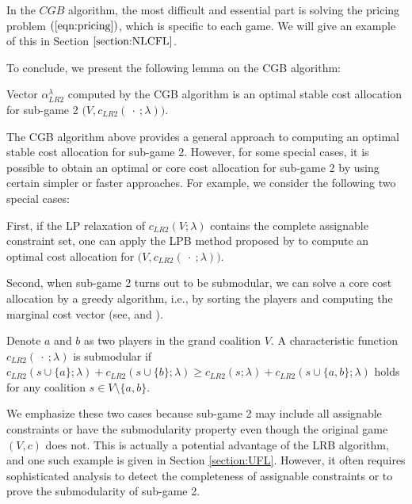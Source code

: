 \documentclass[ijoc,nonblindrev]{informs3} %
\begin{document}
In the $CGB$ algorithm, the most difficult and essential part is solving the pricing problem $(\ref{eqn:pricing})$, which is specific to each game. We will give an example of this in Section $\ref{section:NLCFL}$.

To conclude, we present the following lemma on the CGB algorithm:
\begin {lemma}\label{lemma:lr2core}
Vector $\alpha_{LR2}^{\lambda}$ computed by the CGB algorithm is an optimal stable cost allocation for sub-game 2 $\big(V,c_{LR2}(\ \cdot\ ;\lambda)\big)$.
\end {lemma}

The CGB algorithm above provides a general approach to computing an optimal stable cost allocation for sub-game 2.
However, for some special cases, it is possible to obtain an optimal or core cost allocation for sub-game 2 by using certain simpler or faster approaches. For example, we consider the following two special cases:

First, if the LP relaxation of $c_{LR2}(V;\lambda)$ contains the complete assignable constraint set, one can apply the LPB method proposed by \cite{Caprara2010LPB} to compute an optimal cost allocation for $\big(V,c_{LR2}(\ \cdot\ ;\lambda)\big)$.

Second, when sub-game 2 turns out to be submodular, we can solve a core cost allocation by a greedy algorithm, i.e., by sorting the players and computing the marginal cost vector (see, \citealt{edmonds1970submodular} and \citealt{shapley1971cores}).


\begin{definition}
Denote $a$ and $b$ as two players in the grand coalition $V$. A characteristic function $c_{LR2}(\ \cdot\ ;\lambda)$ is submodular if $c_{LR2}(s \cup \{a\};\lambda) + c_{LR2}(s \cup \{b\};\lambda) \geq c_{LR2}(s;\lambda) + c_{LR2}(s \cup \{a,b\};\lambda)$ holds for any coalition $s \in V \setminus \{a,b\}$.
\end{definition}

We emphasize these two cases because sub-game 2 may include all assignable constraints or have the submodularity property even though the original game $(V,c)$ does not. This is actually a potential advantage of the LRB algorithm, and one such example is given in Section \ref{section:UFL}.
However, it often requires sophisticated analysis to detect the completeness of assignable constraints or to prove the submodularity of sub-game 2.
\end{document}
